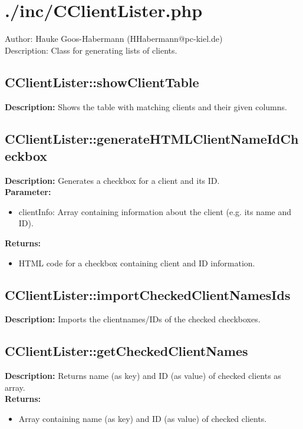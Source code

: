 \newpage\section{./inc/CClientLister.php}
 Author: Hauke Goos-Habermann (HHabermann@pc-kiel.de)\\
 Description: Class for generating lists of clients.\\

\subsection{CClientLister::showClientTable}
\textbf{Description:} Shows the table with matching clients and their given columns.\\

\subsection{CClientLister::generateHTMLClientNameIdCheckbox}
\textbf{Description:} Generates a checkbox for a client and its ID.\\
\textbf{Parameter:}
\begin{itemize}
\item clientInfo: Array containing information about the client (e.g. its name and ID).
\end{itemize}
\textbf{Returns:}
\begin{itemize}
\item HTML code for a checkbox containing client and ID information.
\end{itemize}

\subsection{CClientLister::importCheckedClientNamesIds}
\textbf{Description:} Imports the clientnames/IDs of the checked checkboxes.\\

\subsection{CClientLister::getCheckedClientNames}
\textbf{Description:} Returns name (as key) and ID (as value) of checked clients as array.\\
\textbf{Returns:}
\begin{itemize}
\item Array containing name (as key) and ID (as value) of checked clients.
\end{itemize}

